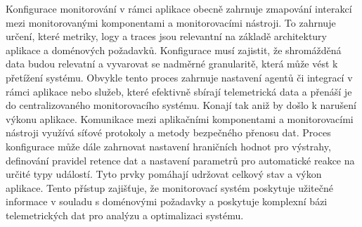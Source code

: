 Konfigurace monitorování v rámci aplikace obecně zahrnuje zmapování interakcí mezi monitorovanými komponentami a monitorovacími nástroji. To zahrnuje určení, které metriky, logy a traces jsou relevantní na základě architektury aplikace a doménových požadavků. Konfigurace musí zajistit, že shromážděná data budou relevatní a vyvarovat se nadměrné granularitě, která může vést k přetížení systému. \cite{Blanco2023} Obvykle tento proces zahrnuje nastavení agentů či integrací v rámci aplikace nebo služeb, které efektivně sbírají telemetrická data a přenáší je do centralizovaného monitorovacího systému. Konají tak aniž by došlo k narušení výkonu aplikace. Komunikace mezi aplikačními komponentami a monitorovacími nástroji využívá síťové protokoly a metody bezpečného přenosu dat. Proces konfigurace může dále zahrnovat nastavení hraničních hodnot pro výstrahy, definování pravidel retence dat a nastavení parametrů pro automatické reakce na určité typy událostí. Tyto prvky pomáhají udržovat celkový stav a výkon aplikace. \cite{Blanco2023} Tento přístup zajišťuje, že monitorovací systém poskytuje užitečné informace v souladu s doménovými požadavky a poskytuje komplexní bázi telemetrických dat pro analýzu a optimalizaci systému.